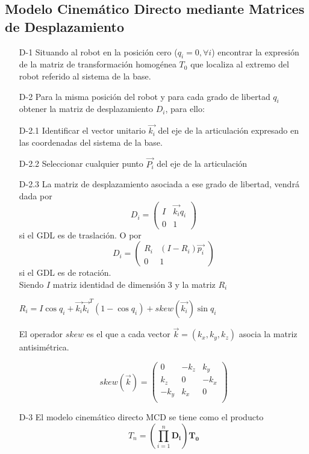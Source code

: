 \subsection{Modelo Cinemático Directo mediante Matrices de Desplazamiento}
\begin{itemize}
\item[D-1] Situando al robot en la posición cero ($q_i=0, \forall i$) encontrar la expresión de la matriz de transformación homogénea $T_0$ que localiza al extremo del robot referido al sistema de la base.

\item[D-2]
Para la misma posición del robot y para cada grado de libertad $q_i$ obtener la matriz de desplazamiento $D_i$, para ello:

\item[D-2.1]
    Identificar el vector unitario $\vec{k_i}$ del eje de la articulación expresado en las coordenadas del sistema de la base.

    

     \item[D-2.2] Seleccionar cualquier punto $\vec{P_i}$ del eje de la articulación

    \item[D-2.3] La matriz de desplazamiento asociada a ese grado de libertad, vendrá dada por\\
$$
D_i=\begin{pmatrix}
I & \vec{k_i}q_i\\
0 & 1
\end{pmatrix} 
$$
si el GDL es de traslación. O por\\
$$
D_i=\begin{pmatrix}
R_i & (I-R_i)\vec{p_i}\\
0 & 1
\end{pmatrix} 
$$
si el GDL es de rotación.\\

Siendo $I$ matriz identidad de dimensión 3 y la matriz $R_i$\\
\begin{center}


$R_i=I\cos{q_i}+\vec{k_i}\vec{k_i}^{T}(1-\cos{q_i})+skew(\vec{k_i})\sin{q_i}$\\
\end{center}
El operador \textbf{$skew$} es el que a cada vector $\vec{k}=(k_x,k_y,k_z)$ asocia la matriz antisimétrica.

$$skew(\vec{k})=\begin{pmatrix}
0 & -k_z & k_y\\
k_z & 0 & -k_x\\
-k_y & k_x & 0\\ 
\end{pmatrix}
$$
    
\item[D-3] El modelo cinemático directo \textsc{MCD} se tiene como el producto
$$
T_n=(\prod_{i=1}^n\mathbf{D_i})\mathbf{T_0}
$$

\end{itemize}

